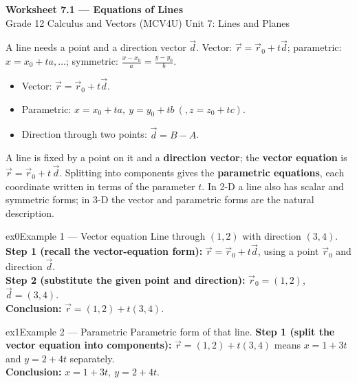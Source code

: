 \documentclass[11pt]{article}
\begin{document}
\begin{center}
{\LARGE\bfseries\color{titleblue}Worksheet 7.1 --- Equations of Lines}\\[2pt]
{\small Grade 12 Calculus and Vectors (MCV4U) \textperiodcentered{} Unit 7: Lines and Planes}
\end{center}

\begin{ideabox}
A line needs a point and a direction vector $\vec d$. Vector: $\vec r=\vec r_0+t\vec d$; parametric: $x=x_0+ta,\dots$; symmetric: $\tfrac{x-x_0}{a}=\tfrac{y-y_0}{b}$.
\begin{itemize}[leftmargin=*,itemsep=2pt]
  \item Vector: $\vec r=\vec r_0+t\vec d$.
  \item Parametric: $x=x_0+ta,\ y=y_0+tb\ (,z=z_0+tc)$.
  \item Direction through two points: $\vec d=B-A$.
\end{itemize}
\end{ideabox}

\begin{learnbox}
A line is fixed by a point on it and a \textbf{direction vector}; the \textbf{vector equation} is $\vec r=\vec r_0+t\,\vec d$.
Splitting into components gives the \textbf{parametric equations}, each coordinate written in terms of the parameter $t$.
In 2-D a line also has scalar and symmetric forms; in 3-D the vector and parametric forms are the natural description.
\end{learnbox}


\begin{example}{ex0}{Example 1 --- Vector equation}
Line through $(1,2)$ with direction $(3,4)$.\soln
\textbf{Step 1 (recall the vector-equation form):} $\vec r=\vec r_0+t\vec d$, using a point $\vec r_0$ and direction $\vec d$.\\[3pt]
\textbf{Step 2 (substitute the given point and direction):} $\vec r_0=(1,2)$, $\vec d=(3,4)$.\\[3pt]
\textbf{Conclusion:} $\vec r=(1,2)+t(3,4)$.
\end{example}

\begin{example}{ex1}{Example 2 --- Parametric}
Parametric form of that line.\soln
\textbf{Step 1 (split the vector equation into components):} $\vec r=(1,2)+t(3,4)$ means $x=1+3t$ and $y=2+4t$ separately.\\[3pt]
\textbf{Conclusion:} $x=1+3t,\ y=2+4t$.
\end{example}
\end{document}
